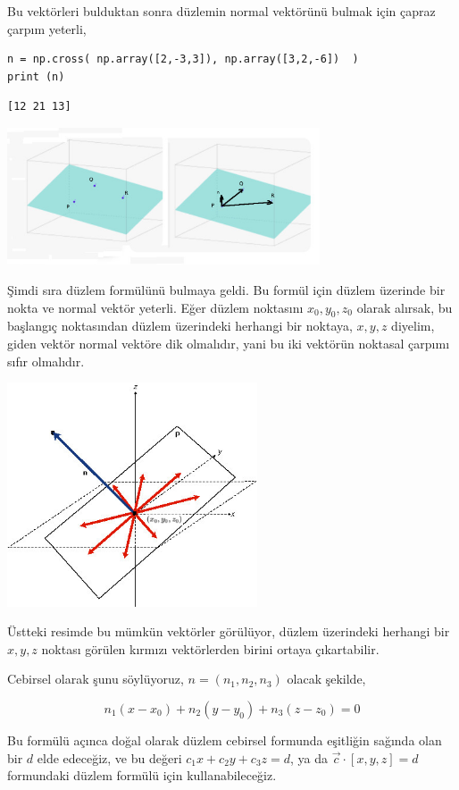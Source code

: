 \documentclass[12pt,fleqn]{article}\usepackage{../../common}
\begin{document}
Bu vektörleri bulduktan sonra düzlemin normal vektörünü bulmak için çapraz
çarpım yeterli,

\begin{verbatim}
n = np.cross( np.array([2,-3,3]), np.array([3,2,-6])  )
print (n)
\end{verbatim}

\begin{verbatim}
[12 21 13]
\end{verbatim}

\includegraphics[width=25em]{4_8.jpg}

Şimdi sıra düzlem formülünü bulmaya geldi. Bu formül için düzlem üzerinde bir
nokta ve normal vektör yeterli. Eğer düzlem noktasını $x_0,y_0,z_0$ olarak
alırsak, bu başlangıç noktasından düzlem üzerindeki herhangi bir noktaya,
$x,y,z$ diyelim, giden vektör normal vektöre dik olmalıdır, yani bu iki
vektörün noktasal çarpımı sıfır olmalıdır.

\includegraphics[width=20em]{4_7.jpg}

Üstteki resimde bu mümkün vektörler görülüyor, düzlem üzerindeki herhangi bir
$x,y,z$ noktası görülen kırmızı vektörlerden birini ortaya çıkartabilir.

Cebirsel olarak şunu söylüyoruz, $n = (n_1,n_2,n_3)$ olacak şekilde,

$$
n_1 (x - x_0) + n_2 (y-y_0) + n_3 (z-z_0) = 0
$$

Bu formülü açınca doğal olarak düzlem cebirsel formunda eşitliğin sağında olan
bir $d$ elde edeceğiz, ve bu değeri $c_1 x + c_2 y + c_3 z = d$, ya da
$\vec{c} \cdot [x,y,z] = d$ formundaki düzlem formülü için kullanabileceğiz.
\end{document}

